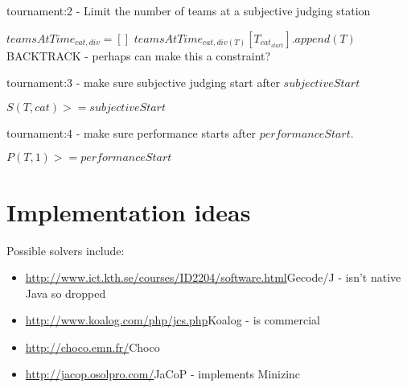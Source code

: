 \documentclass[letterpaper,11pt]{report}
\begin{document}
\begin{algorithm}
\caption{tournament:2 - Limit the number of teams at a subjective judging station}
\begin{algorithmic}
    \STATE $teamsAtTime_{cat,div} = []$
  \ENDFOR
    \STATE $teamsAtTime_{cat,div(T)}[T_{cat_{start}}].append(T)$
  \ENDFOR
        \STATE BACKTRACK - perhaps can make this a constraint?
      \ENDIF
    \ENDFOR
  \ENDFOR
\ENDFOR
\end{algorithmic}
\end{algorithm}

\begin{algorithm}
\caption{tournament:3 - make sure subjective judging start after $subjectiveStart$}
\begin{algorithmic}
    \STATE $S(T, cat) >= subjectiveStart$
  \ENDFOR
\ENDFOR
\end{algorithmic}
\end{algorithm}

\begin{algorithm}
\caption{tournament:4 - make sure performance starts after
$performanceStart$.}
\begin{algorithmic}
  \STATE $P(T, 1) >= performanceStart$
\ENDFOR
\end{algorithmic}
\end{algorithm}

\FloatBarrier
\section{Implementation ideas}
Possible solvers include:
\begin{itemize}
\item \url{http://www.ict.kth.se/courses/ID2204/software.html}{Gecode/J} - isn't native Java so dropped
\item \url{http://www.koalog.com/php/jcs.php}{Koalog} - is commercial
\item \url{http://choco.emn.fr/}{Choco}
\item \url{http://jacop.osolpro.com/}{JaCoP} - implements Minizinc
\end{itemize}

\FloatBarrier
\end{document}
